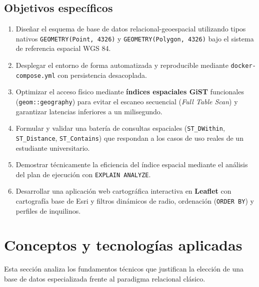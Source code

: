\documentclass[a4paper,12pt]{article}
\begin{document}
\subsection{Objetivos específicos}
\begin{enumerate}[leftmargin=1.0cm]
  \item Diseñar el esquema de base de datos relacional-geoespacial utilizando tipos nativos \texttt{GEOMETRY(Point, 4326)} y \texttt{GEOMETRY(Polygon, 4326)} bajo el sistema de referencia espacial WGS 84.
  \item Desplegar el entorno de forma automatizada y reproducible mediante \texttt{docker-compose.yml} con persistencia desacoplada.
  \item Optimizar el acceso físico mediante \textbf{índices espaciales GiST} funcionales (\texttt{geom::geography}) para evitar el escaneo secuencial (\textit{Full Table Scan}) y garantizar latencias inferiores a un milisegundo.
  \item Formular y validar una batería de consultas espaciales (\texttt{ST\_DWithin}, \texttt{ST\_Distance}, \texttt{ST\_Contains}) que respondan a los casos de uso reales de un estudiante universitario.
  \item Demostrar técnicamente la eficiencia del índice espacial mediante el análisis del plan de ejecución con \texttt{EXPLAIN ANALYZE}.
  \item Desarrollar una aplicación web cartográfica interactiva en \textbf{Leaflet} con cartografía base de Esri y filtros dinámicos de radio, ordenación (\texttt{ORDER BY}) y perfiles de inquilinos.
\end{enumerate}

\section{Conceptos y tecnologías aplicadas}

Esta sección analiza los fundamentos técnicos que justifican la elección de una base de datos especializada frente al paradigma relacional clásico.
\end{document}
